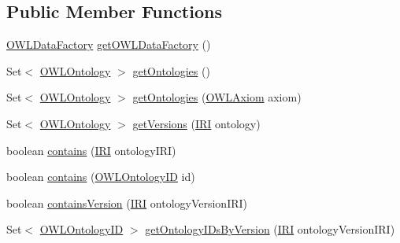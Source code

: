 \subsection*{Public Member Functions}
\begin{DoxyCompactItemize}
\item 
\hyperlink{interfaceorg_1_1semanticweb_1_1owlapi_1_1model_1_1_o_w_l_data_factory}{O\-W\-L\-Data\-Factory} \hyperlink{interfaceorg_1_1semanticweb_1_1owlapi_1_1model_1_1_o_w_l_ontology_manager_a0657672e9b08295444923f619460b3c3}{get\-O\-W\-L\-Data\-Factory} ()
\item 
Set$<$ \hyperlink{interfaceorg_1_1semanticweb_1_1owlapi_1_1model_1_1_o_w_l_ontology}{O\-W\-L\-Ontology} $>$ \hyperlink{interfaceorg_1_1semanticweb_1_1owlapi_1_1model_1_1_o_w_l_ontology_manager_a5cddf64322525dd0b5e06c7c5d170ad3}{get\-Ontologies} ()
\item 
Set$<$ \hyperlink{interfaceorg_1_1semanticweb_1_1owlapi_1_1model_1_1_o_w_l_ontology}{O\-W\-L\-Ontology} $>$ \hyperlink{interfaceorg_1_1semanticweb_1_1owlapi_1_1model_1_1_o_w_l_ontology_manager_ad420632b40c7f2bf289763da0374b191}{get\-Ontologies} (\hyperlink{interfaceorg_1_1semanticweb_1_1owlapi_1_1model_1_1_o_w_l_axiom}{O\-W\-L\-Axiom} axiom)
\item 
Set$<$ \hyperlink{interfaceorg_1_1semanticweb_1_1owlapi_1_1model_1_1_o_w_l_ontology}{O\-W\-L\-Ontology} $>$ \hyperlink{interfaceorg_1_1semanticweb_1_1owlapi_1_1model_1_1_o_w_l_ontology_manager_acca35890c1895509d33d1e867f9cd41c}{get\-Versions} (\hyperlink{classorg_1_1semanticweb_1_1owlapi_1_1model_1_1_i_r_i}{I\-R\-I} ontology)
\item 
boolean \hyperlink{interfaceorg_1_1semanticweb_1_1owlapi_1_1model_1_1_o_w_l_ontology_manager_aa1349330f659692c7ee68459561a309d}{contains} (\hyperlink{classorg_1_1semanticweb_1_1owlapi_1_1model_1_1_i_r_i}{I\-R\-I} ontology\-I\-R\-I)
\item 
boolean \hyperlink{interfaceorg_1_1semanticweb_1_1owlapi_1_1model_1_1_o_w_l_ontology_manager_a5ac584dbe315b191bf520ab68fdb42e6}{contains} (\hyperlink{classorg_1_1semanticweb_1_1owlapi_1_1model_1_1_o_w_l_ontology_i_d}{O\-W\-L\-Ontology\-I\-D} id)
\item 
boolean \hyperlink{interfaceorg_1_1semanticweb_1_1owlapi_1_1model_1_1_o_w_l_ontology_manager_afeecb84eb66ae98d9cff88387622aa4e}{contains\-Version} (\hyperlink{classorg_1_1semanticweb_1_1owlapi_1_1model_1_1_i_r_i}{I\-R\-I} ontology\-Version\-I\-R\-I)
\item 
Set$<$ \hyperlink{classorg_1_1semanticweb_1_1owlapi_1_1model_1_1_o_w_l_ontology_i_d}{O\-W\-L\-Ontology\-I\-D} $>$ \hyperlink{interfaceorg_1_1semanticweb_1_1owlapi_1_1model_1_1_o_w_l_ontology_manager_a847282c7cf9f4ee467ddd913d0561ea3}{get\-Ontology\-I\-Ds\-By\-Version} (\hyperlink{classorg_1_1semanticweb_1_1owlapi_1_1model_1_1_i_r_i}{I\-R\-I} ontology\-Version\-I\-R\-I)

\end{DoxyCompactItemize}
